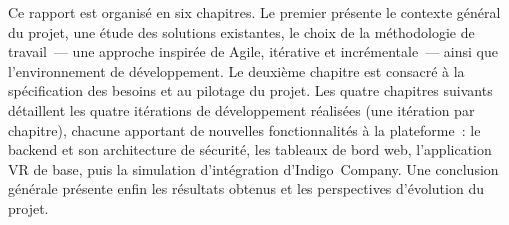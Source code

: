 Ce rapport est organisé en six chapitres. Le premier présente le contexte général du
projet, une étude des solutions existantes, le choix de la méthodologie de travail~---
une approche inspirée de Agile, itérative et incrémentale~--- ainsi que l'environnement de
développement. Le deuxième chapitre est consacré à la spécification des besoins et au
pilotage du projet. Les quatre chapitres suivants détaillent les quatre itérations de
développement réalisées (une itération par chapitre), chacune apportant de nouvelles fonctionnalités à la plateforme~:
le backend et son architecture de sécurité, les tableaux de bord web, l'application VR de
base, puis la simulation d'intégration d'Indigo~Company. Une conclusion générale présente
enfin les résultats obtenus et les perspectives d'évolution du projet.

\clearpage
